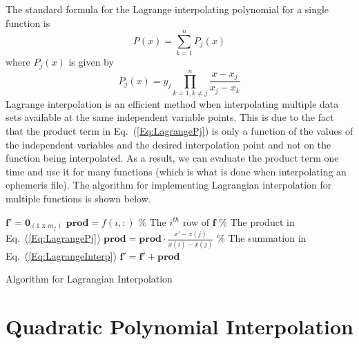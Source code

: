 The standard formula for the Lagrange interpolating polynomial for a
single function is
%
\begin{equation}
    P(x) =  \sum_{k=1}^n P_j(x) \label{Eq:LagrangeInterp}
\end{equation}
%
where $P_j(x)$ is given by
%
\begin{equation}
   P_j(x) = y_j\prod_{k=1,k \neq j}^n\frac{x - x_j}{x_j - x_k} \label{Eq:LagrangePj}
\end{equation}
%
Lagrange interpolation is an efficient method when interpolating
multiple data sets available at the same independent variable
points.  This is due to the fact that the product term in
Eq.~(\ref{Eq:LagrangePj}) is only a function of the values of the
independent variables and the desired interpolation point and not on
the function being interpolated.  As a result, we can evaluate the
product term one time and use it for many functions (which is what
is done when interpolating an ephemeris file).  The algorithm for
implementing Lagrangian interpolation for multiple functions is
shown below.

\begin{center}
\begin{minipage}{6 in}
\begin{small}
\begin{algorithm}[H]

    $\mathbf{f}' = \mathbf{0}_{(1 \mbox{ x } m_f)}$\;
    {
        $\mathbf{prod} = f(i,:)$ \% The $i^{th}$ row of $\mathbf{f}$ \;
        {
            {
            \% The product in Eq.~(\ref{Eq:LagrangePj})\;
                    $ \mathbf{prod} = \mathbf{prod} \cdot \displaystyle\frac{x' - x(j)}{x(i) - x(j)}$\;
            }
        }
       \% The summation in Eq.~(\ref{Eq:LagrangeInterp})\;
       $ \mathbf{f}'= \mathbf{f}' + \mathbf{prod}$\;
    }
    \hspace{.2 in}
    \label{alg:LagrangeInterpolation}\caption{Algorithm for Lagrangian Interpolation}
\end{algorithm}
\end{small}
\end{minipage}
\end{center}


\section{Quadratic Polynomial Interpolation }


